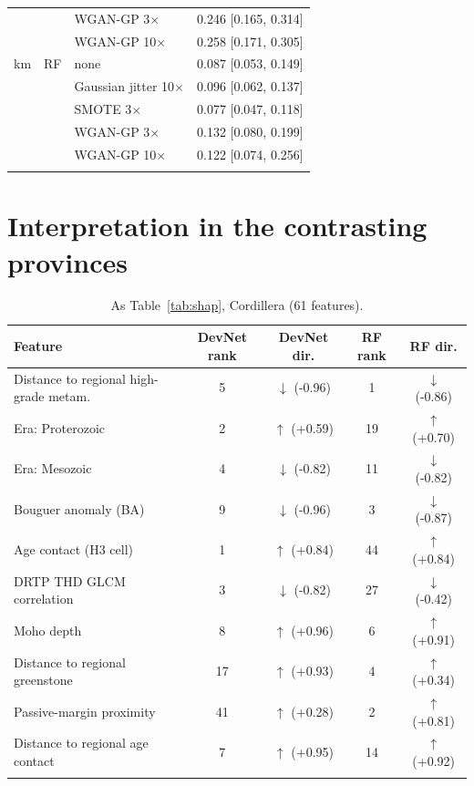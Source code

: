 \documentclass[pdflatex,sn-apa]{sn-jnl}
\begin{document}
\begin{appendices}
\begin{table}[!h]
\begin{tabular*}{0.7\textwidth}{@{\extracolsep\fill}lllc}
 &  & WGAN-GP 3$\times$ & 0.246 [0.165, 0.314] \\
 &  & WGAN-GP 10$\times$ & 0.258 [0.171, 0.305] \\
\addlinespace
200 km & RF & none & 0.087 [0.053, 0.149] \\
 &  & Gaussian jitter 10$\times$ & 0.096 [0.062, 0.137] \\
 &  & SMOTE 3$\times$ & 0.077 [0.047, 0.118] \\
 &  & WGAN-GP 3$\times$ & 0.132 [0.080, 0.199] \\
 &  & WGAN-GP 10$\times$ & 0.122 [0.074, 0.256] \\
\botrule
\end{tabular*}
\end{table}

\clearpage
\section{Interpretation in the contrasting provinces}\label{app:shap}

\begin{table}[!h]
\caption{As Table~\ref{tab:shap}, Cordillera (61 features).}\label{tab:shap-cord}
\footnotesize
\begin{tabular*}{\textwidth}{@{\extracolsep\fill}lcccc}
\toprule
Feature & DevNet rank & DevNet dir. & RF rank & RF dir. \\
\midrule
Distance to regional high-grade metam. & 5 & $\downarrow$ (-0.96) & 1 & $\downarrow$ (-0.86) \\
Era: Proterozoic & 2 & $\uparrow$ (+0.59) & 19 & $\uparrow$ (+0.70) \\
Era: Mesozoic & 4 & $\downarrow$ (-0.82) & 11 & $\downarrow$ (-0.82) \\
Bouguer anomaly (BA) & 9 & $\downarrow$ (-0.96) & 3 & $\downarrow$ (-0.87) \\
Age contact (H3 cell) & 1 & $\uparrow$ (+0.84) & 44 & $\uparrow$ (+0.84) \\
DRTP THD GLCM correlation & 3 & $\downarrow$ (-0.82) & 27 & $\downarrow$ (-0.42) \\
Moho depth & 8 & $\uparrow$ (+0.96) & 6 & $\uparrow$ (+0.91) \\
Distance to regional greenstone & 17 & $\uparrow$ (+0.93) & 4 & $\uparrow$ (+0.34) \\
Passive-margin proximity & 41 & $\uparrow$ (+0.28) & 2 & $\uparrow$ (+0.81) \\
Distance to regional age contact & 7 & $\uparrow$ (+0.95) & 14 & $\uparrow$ (+0.92) \\
\botrule
\end{tabular*}
\end{table}


\end{appendices}
\end{document}
